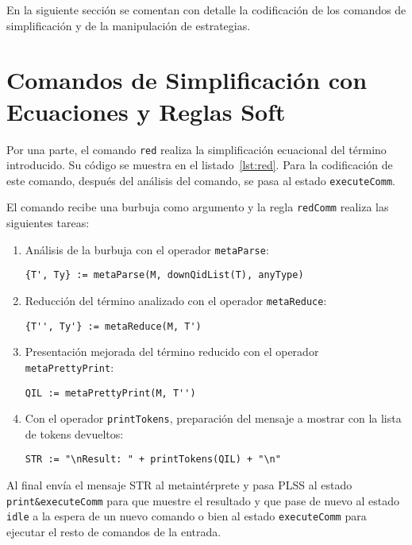 En la siguiente sección se comentan con detalle la codificación de los comandos de simplificación y de la manipulación de estrategias.
\medskip



\section{Comandos de Simplificación con Ecuaciones y Reglas Soft}

Por una parte, el comando \texttt{red} realiza la simplificación ecuacional del término introducido.
Su código se muestra en el listado~\ref{lst:red}.
%
Para la codificación de este comando, después del análisis del comando, se pasa al estado \texttt{executeComm}.

El comando recibe una burbuja como argumento y la regla \texttt{redComm} realiza las siguientes tareas:

\begin{enumerate}
\item Análisis de la burbuja con el operador \texttt{metaParse}:
\begin{lstlisting}[language=Maude]
  {T', Ty} := metaParse(M, downQidList(T), anyType)
\end{lstlisting}

\item Reducción del término analizado con el operador \texttt{metaReduce}:
\begin{lstlisting}[language=Maude]
     {T'', Ty'} := metaReduce(M, T')
\end{lstlisting}

\item Presentación mejorada del término reducido con el operador \texttt{metaPrettyPrint}:
\begin{lstlisting}[language=Maude]
     QIL := metaPrettyPrint(M, T'')
\end{lstlisting}

\item Con el operador \texttt{printTokens}, preparación del mensaje a mostrar con la lista de tokens devueltos:
\begin{lstlisting}[language=Maude]
     STR := "\nResult: " + printTokens(QIL) + "\n" 
\end{lstlisting}
\end{enumerate}
\smallskip

Al final envía el mensaje STR al metaintérprete y pasa PLSS al estado \texttt{print\&executeComm} para que muestre el resultado y que pase de nuevo al estado \texttt{idle} a la espera de un nuevo comando o bien al estado \texttt{executeComm} para ejecutar el resto de comandos de la entrada.
\medskip


